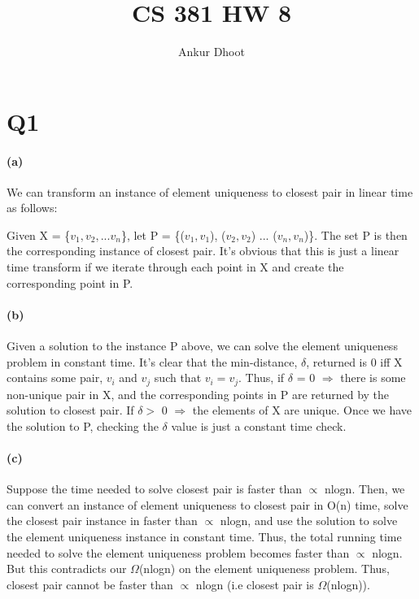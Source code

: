 \documentclass[11pt,a4paper]{article}
\begin{document}
\author{Ankur Dhoot}
\title{CS 381 HW 8}
\maketitle

\section*{Q1}

\paragraph{(a)}
We can transform an instance of element uniqueness to closest pair in linear time as follows:

Given X = \{$v_{1}, v_{2}, ... v_{n}$\}, let P = \{($v_{1}, v_{1}$), ($v_{2}, v_{2}$) ... ($v_{n}, v_{n}$)\}. The set P is then the corresponding instance of closest pair. It's obvious that this is just a linear time transform if we iterate through each point in X and create the corresponding point in P.

\paragraph{(b)}

Given a solution to the instance P above, we can solve the element uniqueness problem in constant time. It's clear that the min-distance, $\delta$, returned is 0 iff X contains some pair, $v_{i}$ and $v_{j}$ such that $v_{i} = v_{j}$. Thus, if $\delta$ = 0 $\Rightarrow$ there is some non-unique pair in X, and the corresponding points in P are returned by the solution to closest pair. If $\delta > $ 0 $\Rightarrow$ the elements of X are unique. Once we have the solution to P, checking the $\delta$ value is just a constant time check.

\paragraph{(c)}
Suppose the time needed to solve closest pair is faster than $\propto$ nlogn. Then, we can convert an instance of element uniqueness to closest pair in O(n) time, solve the closest pair instance in faster than $\propto$ nlogn, and use the solution to solve the element uniqueness instance in constant time. Thus, the total running time needed to solve the element uniqueness problem becomes faster than $\propto$ nlogn. But this contradicts our $\Omega$(nlogn) on the element uniqueness problem. Thus, closest pair cannot be faster than $\propto$ nlogn (i.e closest pair is $\Omega$(nlogn)).
\end{document}
